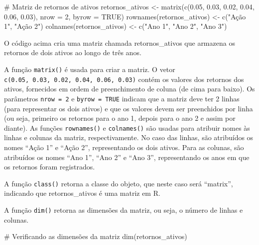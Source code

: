 \documentclass[
  portuguese,
  letterpaper,
  DIV=11,
  numbers=noendperiod]{scrreprt}
\newenvironment{Shaded}{\begin{snugshade}}{\end{snugshade}}
\newcommand{\AttributeTok}[1]{\textcolor[rgb]{0.40,0.45,0.13}{#1}}
\newcommand{\CommentTok}[1]{\textcolor[rgb]{0.37,0.37,0.37}{#1}}
\newcommand{\ConstantTok}[1]{\textcolor[rgb]{0.56,0.35,0.01}{#1}}
\newcommand{\DecValTok}[1]{\textcolor[rgb]{0.68,0.00,0.00}{#1}}
\newcommand{\FloatTok}[1]{\textcolor[rgb]{0.68,0.00,0.00}{#1}}
\newcommand{\FunctionTok}[1]{\textcolor[rgb]{0.28,0.35,0.67}{#1}}
\newcommand{\NormalTok}[1]{\textcolor[rgb]{0.00,0.23,0.31}{#1}}
\newcommand{\OtherTok}[1]{\textcolor[rgb]{0.00,0.23,0.31}{#1}}
\newcommand{\StringTok}[1]{\textcolor[rgb]{0.13,0.47,0.30}{#1}}
\theoremstyle{definition}
\theoremstyle{remark}
\begin{document}
\begin{Shaded}
\begin{Highlighting}[]
\CommentTok{\# Matriz de retornos de ativos}
\NormalTok{retornos\_ativos }\OtherTok{\textless{}{-}} \FunctionTok{matrix}\NormalTok{(}\FunctionTok{c}\NormalTok{(}\FloatTok{0.05}\NormalTok{, }\FloatTok{0.03}\NormalTok{, }\FloatTok{0.02}\NormalTok{, }\FloatTok{0.04}\NormalTok{, }\FloatTok{0.06}\NormalTok{, }\FloatTok{0.03}\NormalTok{), }
                          \AttributeTok{nrow =} \DecValTok{2}\NormalTok{, }\AttributeTok{byrow =} \ConstantTok{TRUE}\NormalTok{)}
\FunctionTok{rownames}\NormalTok{(retornos\_ativos) }\OtherTok{\textless{}{-}} \FunctionTok{c}\NormalTok{(}\StringTok{"Ação 1"}\NormalTok{, }\StringTok{"Ação 2"}\NormalTok{)}
\FunctionTok{colnames}\NormalTok{(retornos\_ativos) }\OtherTok{\textless{}{-}} \FunctionTok{c}\NormalTok{(}\StringTok{"Ano 1"}\NormalTok{, }\StringTok{"Ano 2"}\NormalTok{, }\StringTok{"Ano 3"}\NormalTok{)}
\end{Highlighting}
\end{Shaded}

O código acima cria uma matriz chamada retornos\_ativos que armazena os
retornos de dois ativos ao longo de três anos.

A função \texttt{matrix()} é usada para criar a matriz. O vetor
\texttt{c(0.05,\ 0.03,\ 0.02,\ 0.04,\ 0.06,\ 0.03)} contém os valores
dos retornos dos ativos, fornecidos em ordem de preenchimento de coluna
(de cima para baixo). Os parâmetros \texttt{nrow\ =\ 2} e
\texttt{byrow\ =\ TRUE} indicam que a matriz deve ter 2 linhas (para
representar os dois ativos) e que os valores devem ser preenchidos por
linha (ou seja, primeiro os retornos para o ano 1, depois para o ano 2 e
assim por diante). As funções \texttt{rownames()} e \texttt{colnames()}
são usadas para atribuir nomes às linhas e colunas da matriz,
respectivamente. No caso das linhas, são atribuídos os nomes ``Ação 1''
e ``Ação 2'', representando os dois ativos. Para as colunas, são
atribuídos os nomes ``Ano 1'', ``Ano 2'' e ``Ano 3'', representando os
anos em que os retornos foram registrados.

A função \texttt{class()} retorna a classe do objeto, que neste caso
será ``matrix'', indicando que retornos\_ativos é uma matriz em R.

A função \texttt{dim()} retorna as dimensões da matriz, ou seja, o
número de linhas e colunas.

\begin{Shaded}
\begin{Highlighting}[]
\CommentTok{\# Verificando as dimensões da matriz}
\FunctionTok{dim}\NormalTok{(retornos\_ativos)}
\end{Highlighting}
\end{Shaded}
\end{document}
